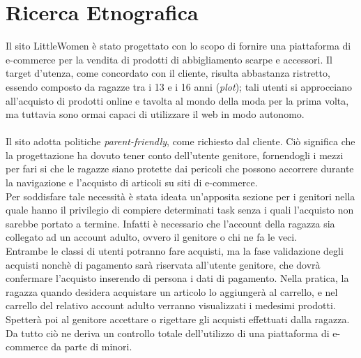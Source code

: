 \documentclass[12pt,a4paper]{report}
\begin{document}
\chapter{Ricerca Etnografica}
Il sito LittleWomen è stato progettato con lo scopo di fornire una piattaforma di e-commerce per la vendita di prodotti di abbigliamento scarpe e accessori. Il target d'utenza, come concordato con il cliente, risulta abbastanza ristretto, essendo composto da ragazze tra i 13 e i 16 anni (\textit{plot}); tali utenti si approcciano all'acquisto di prodotti online e tavolta al mondo della moda per la prima volta, ma tuttavia sono ormai capaci di utilizzare il web in modo autonomo.\\ \\ Il sito adotta politiche \textit{parent-friendly}, come richiesto dal cliente. Ciò significa che la progettazione ha dovuto tener conto dell'utente genitore, fornendogli i mezzi per fari si che le ragazze siano protette dai pericoli che possono accorrere durante la navigazione e l'acquisto di articoli su siti di e-commerce.\\
Per soddisfare tale necessità è stata ideata un'apposita sezione per i genitori nella quale hanno il privilegio di compiere determinati task senza i quali l'acquisto non sarebbe portato a termine. Infatti è necessario che l'account della ragazza sia collegato ad un account adulto, ovvero il genitore o chi ne fa le veci. \\Entrambe le classi di utenti potranno fare acquisti, ma la fase validazione degli acquisti nonchè di pagamento sarà riservata all'utente genitore, che dovrà confermare l'acquisto inserendo di persona i dati di pagamento. Nella pratica, la ragazza quando desidera acquistare un articolo lo aggiungerà al carrello, e nel carrello del relativo account adulto verranno visualizzati i medesimi prodotti. \\ Spetterà poi al genitore accettare o rigettare gli acquisti effettuati dalla ragazza. Da tutto ciò ne deriva un controllo totale dell'utilizzo di una piattaforma di e-commerce da parte di minori.
\end{document}
